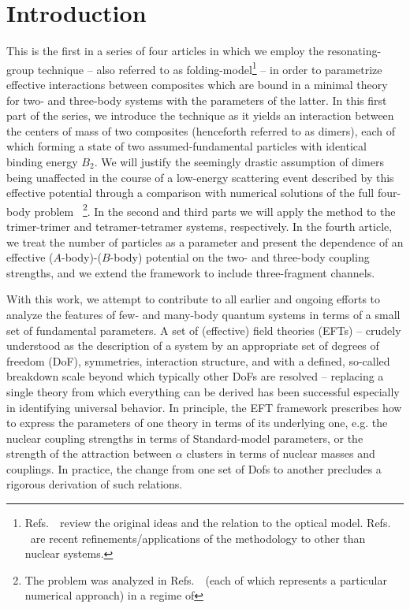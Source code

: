 \documentclass[preprint,aps,onecolumn,preprintnumbers,amsmath,amssymb,nofootinbib,superscriptaddress]{revtex4-1}
\newcommand{\bd}{\ensuremath{B_2}}
\begin{document}
\section{Introduction}
This is the first in a series of four articles in which we employ the resonating-group 
technique -- also referred to as folding-model\footnote{Refs.~\cite{SINHA19751,Satchler:1979ni}~review the
original ideas and the relation to the optical model. Refs.~\cite{Naidon_2016,Kanada-Enyo:2020zzf,Rokash:2016tqh}
~are recent refinements/applications of the methodology to other than nuclear systems.} -- in order
to parametrize effective interactions between composites which are bound in a minimal
theory for two- and three-body systems with the parameters of the latter.
In this first part of the series, we introduce the technique as it yields an interaction
between the centers of mass of two composites (henceforth referred to as dimers), each of which
forming a state of two assumed-fundamental particles with identical binding energy $\bd$.
We will justify the seemingly drastic assumption of dimers being unaffected in the course of
a low-energy scattering event described by this effective potential through a comparison with
numerical solutions of the full four-body problem~\cite{Petrov_2004}
\footnote{The problem was analyzed in Refs.~\cite{Elhatisari_2017,Schafer:2022hzo,Deltuva_2022}~(each of which represents a
particular numerical approach) in a regime of }.
In the second and third parts we will apply
the method to the trimer-trimer and tetramer-tetramer systems, respectively.
In the fourth article, we treat the number of particles as a parameter and present the dependence
of an effective ($A$-body)-($B$-body) potential on the two- and three-body coupling strengths, and we
extend the framework to include three-fragment channels.

With this work, we attempt to contribute to all earlier and ongoing efforts to analyze the features
of few- and many-body quantum systems in terms of a small set of fundamental parameters.
A set of (effective) field theories (EFTs) -- crudely understood as the description of a system by an appropriate set
of degrees of freedom (DoF), symmetries, interaction structure, and with a defined, so-called breakdown
scale beyond which typically other DoFs are resolved -- replacing a single theory from which everything can
be derived has been successful especially in identifying universal behavior.
In principle, the EFT framework
prescribes how to express the parameters of one theory in terms of its underlying one,
e.g. the nuclear coupling strengths in terms of Standard-model parameters, or the strength of the attraction
between $\alpha$ clusters in terms of nuclear masses and couplings. In practice, the change from one set of Dofs to another
precludes a rigorous derivation of such relations.
\end{document}
